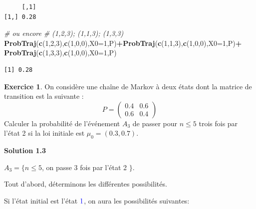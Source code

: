 \documentclass[
]{book}
\newenvironment{Shaded}{\begin{snugshade}}{\end{snugshade}}
\newcommand{\CommentTok}[1]{\textcolor[rgb]{0.56,0.35,0.01}{\textit{#1}}}
\newcommand{\DataTypeTok}[1]{\textcolor[rgb]{0.13,0.29,0.53}{#1}}
\newcommand{\DecValTok}[1]{\textcolor[rgb]{0.00,0.00,0.81}{#1}}
\newcommand{\KeywordTok}[1]{\textcolor[rgb]{0.13,0.29,0.53}{\textbf{#1}}}
\newcommand{\NormalTok}[1]{#1}
\newcommand{\OperatorTok}[1]{\textcolor[rgb]{0.81,0.36,0.00}{\textbf{#1}}}
\newcommand{\StringTok}[1]{\textcolor[rgb]{0.31,0.60,0.02}{#1}}
\theoremstyle{definition}
\theoremstyle{definition}
\theoremstyle{definition}
\newtheorem{exercise}{Exercice}[chapter]
\theoremstyle{remark}
\begin{document}
\begin{verbatim}
     [,1]
[1,] 0.28
\end{verbatim}

\begin{Shaded}
\begin{Highlighting}[]
\CommentTok{# ou encore}
\CommentTok{# (1,2,3); (1,1,3); (1,3,3)}
\KeywordTok{ProbTraj}\NormalTok{(}\KeywordTok{c}\NormalTok{(}\DecValTok{1}\NormalTok{,}\DecValTok{2}\NormalTok{,}\DecValTok{3}\NormalTok{),}\KeywordTok{c}\NormalTok{(}\DecValTok{1}\NormalTok{,}\DecValTok{0}\NormalTok{,}\DecValTok{0}\NormalTok{),}\DataTypeTok{X0=}\DecValTok{1}\NormalTok{,P)}\OperatorTok{+}\KeywordTok{ProbTraj}\NormalTok{(}\KeywordTok{c}\NormalTok{(}\DecValTok{1}\NormalTok{,}\DecValTok{1}\NormalTok{,}\DecValTok{3}\NormalTok{),}\KeywordTok{c}\NormalTok{(}\DecValTok{1}\NormalTok{,}\DecValTok{0}\NormalTok{,}\DecValTok{0}\NormalTok{),}\DataTypeTok{X0=}\DecValTok{1}\NormalTok{,P)}\OperatorTok{+}
\StringTok{  }\KeywordTok{ProbTraj}\NormalTok{(}\KeywordTok{c}\NormalTok{(}\DecValTok{1}\NormalTok{,}\DecValTok{3}\NormalTok{,}\DecValTok{3}\NormalTok{),}\KeywordTok{c}\NormalTok{(}\DecValTok{1}\NormalTok{,}\DecValTok{0}\NormalTok{,}\DecValTok{0}\NormalTok{),}\DataTypeTok{X0=}\DecValTok{1}\NormalTok{,P)}
\end{Highlighting}
\end{Shaded}

\begin{verbatim}
[1] 0.28
\end{verbatim}

\begin{exercise}
\protect\hypertarget{exr:unnamed-chunk-57}{}{\label{exr:unnamed-chunk-57} } On considère une chaîne de Markov à deux états dont la matrice de transition est la suivante :
\[ P=\left( 
  \begin{array}{cc}
0.4 & 0.6 \\
0.6 & 0.4 
\end{array}
\right)\]
Calculer la probabilité de l'événement \(A_3\) de passer pour \(n \leq 5\) trois fois par l'état 2 si la loi initiale est \(\mu_0=(0.3,0.7)\).
\end{exercise}

\textbf{Solution 1.3}

\(A_3=\{n \leq 5\), on passe 3 fois par l'état 2 \(\}\).

Tout d'abord, déterminons les différentes possibilités.

Si l'état initial est l'état \(\color{blue}{1}\), on aura les possibilités suivantes:
\end{document}
